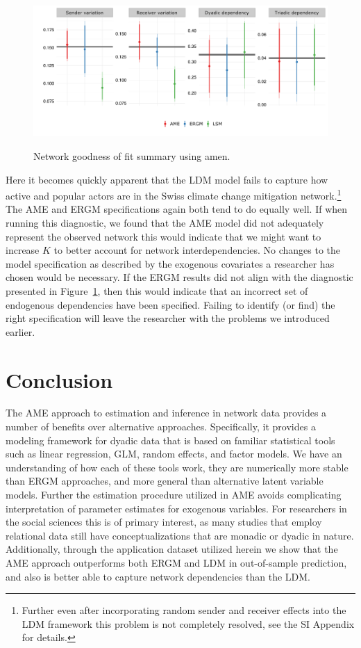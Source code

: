 \documentclass[12pt,pdflatex]{elsarticle}
\newcommand{\pkg}[1]{{\fontseries{b}\selectfont #1}}
\begin{document}
\begin{figure}[ht]
	\centering
	\caption{Network goodness of fit summary using \pkg{amen}.}
	\includegraphics[width=1\textwidth]{netPerfCoef}
	\label{fig:ergmAmePerf}
\end{figure}
\FloatBarrier

Here it becomes quickly apparent that the LDM model fails to capture how active and popular actors are in the Swiss climate change mitigation network.\footnote{Further even after incorporating random sender and receiver effects into the LDM framework this problem is not completely resolved, see the SI Appendix for details.} The AME and ERGM specifications again both tend to do equally well. If when running this diagnostic, we found that the AME model did not adequately represent the observed network this would indicate that we might want to increase $K$ to better account for network interdependencies. No changes to the model specification as described by the exogenous covariates a researcher has chosen would be necessary. If the ERGM results did not align with the diagnostic presented in Figure~\ref{fig:ergmAmePerf}, then this would indicate that an incorrect set of endogenous dependencies have been specified. Failing to identify (or find) the right specification will leave the researcher with the problems we introduced earlier.

\section*{\textbf{Conclusion}}

The AME approach to estimation and inference in network data provides a number of benefits over alternative approaches. Specifically, it provides a modeling framework for dyadic data that is based on familiar statistical tools such as linear regression, GLM, random effects, and factor models. We have an understanding of how each of these tools work, they are numerically more stable than ERGM approaches, and more general than alternative latent variable models. Further the estimation procedure utilized in AME avoids complicating interpretation of parameter estimates for exogenous variables. For researchers in the social sciences this is of primary interest, as many studies that employ relational data still have conceptualizations that are monadic or dyadic in nature. Additionally, through the application dataset utilized herein we show that the AME approach outperforms both ERGM and LDM in out-of-sample prediction, and also is better able to capture network dependencies than the LDM.
\end{document}
